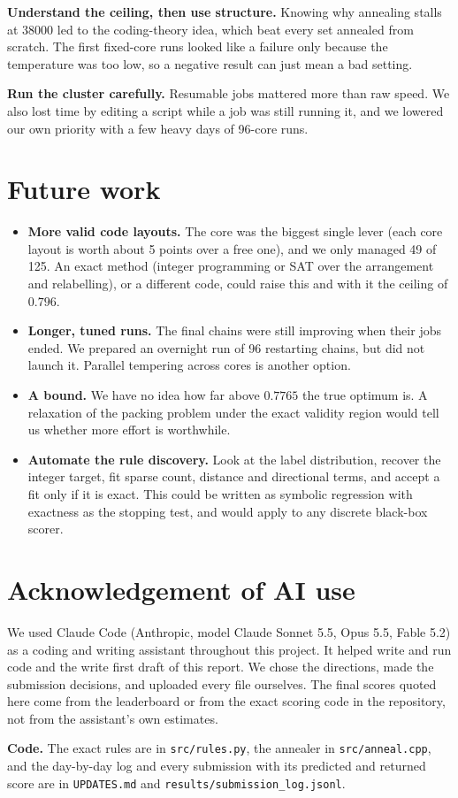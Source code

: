 \documentclass[10pt]{article}
\begin{document}
\textbf{Understand the ceiling, then use structure.} Knowing why annealing stalls at 38000 led to the coding-theory idea, which beat every set annealed from scratch. The first fixed-core runs looked like a failure only because the temperature was too low, so a negative result can just mean a bad setting.

\textbf{Run the cluster carefully.} Resumable jobs mattered more than raw speed. We also lost time by editing a script while a job was still running it, and we lowered our own priority with a few heavy days of 96-core runs.

\section{Future work}

\begin{itemize}
\item \textbf{More valid code layouts.} The core was the biggest single lever (each core layout is worth about 5 points over a free one), and we only managed 49 of 125. An exact method (integer programming or SAT over the arrangement and relabelling), or a different code, could raise this and with it the ceiling of $0.796$.
\item \textbf{Longer, tuned runs.} The final chains were still improving when their jobs ended. We prepared an overnight run of 96 restarting chains, but did not launch it. Parallel tempering across cores is another option.
\item \textbf{A bound.} We have no idea how far above $0.7765$ the true optimum is. A relaxation of the packing problem under the exact validity region would tell us whether more effort is worthwhile.
\item \textbf{Automate the rule discovery.} Look at the label distribution, recover the integer target, fit sparse count, distance and directional terms, and accept a fit only if it is exact. This could be written as symbolic regression with exactness as the stopping test, and would apply to any discrete black-box scorer.
\end{itemize}

\section*{Acknowledgement of AI use}
We used Claude Code (Anthropic, model Claude Sonnet 5.5, Opus 5.5, Fable 5.2) as a coding and writing assistant throughout this project. It helped write and run code and the write first draft of this report. We chose the directions, made the submission decisions, and uploaded every file ourselves. The final scores quoted here come from the leaderboard or from the exact scoring code in the repository, not from the assistant's own estimates.

\textbf{Code.} The exact rules are in \texttt{src/rules.py}, the annealer in \texttt{src/anneal.cpp}, and the day-by-day log and every submission with its predicted and returned score are in \texttt{UPDATES.md} and \texttt{results/submission\_log.jsonl}.
\end{document}
